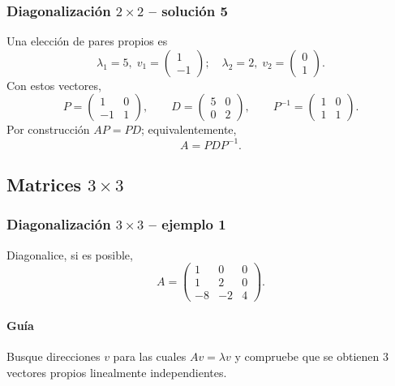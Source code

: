 \subsubsection*{Diagonalización $2\times 2$ -- solución 5}
\scriptsize
Una elección de pares propios es
\[
\lambda_1=5,\;v_1=\begin{pmatrix}1\\-1\end{pmatrix};\quad \lambda_2=2,\;v_2=\begin{pmatrix}0\\1\end{pmatrix}.
\]
Con estos vectores,
\[
P=\begin{pmatrix}1 & 0\\-1 & 1\end{pmatrix},\qquad D=\begin{pmatrix}5 & 0\\0 & 2\end{pmatrix},\qquad P^{-1}=\begin{pmatrix}1 & 0\\1 & 1\end{pmatrix}.
\]
Por construcción $AP=PD$; equivalentemente,
\[
\boxed{A=PDP^{-1}}.
\]

\subsection{Matrices $3\times 3$}

\subsubsection*{Diagonalización $3\times 3$ -- ejemplo 1}

Diagonalice, si es posible,
\[
A=\begin{pmatrix}1 & 0 & 0\\1 & 2 & 0\\-8 & -2 & 4\end{pmatrix}.
\]

\paragraph{Guía}
Busque direcciones $v$ para las cuales $Av=\lambda v$ y compruebe que se obtienen $3$ vectores propios linealmente independientes.



